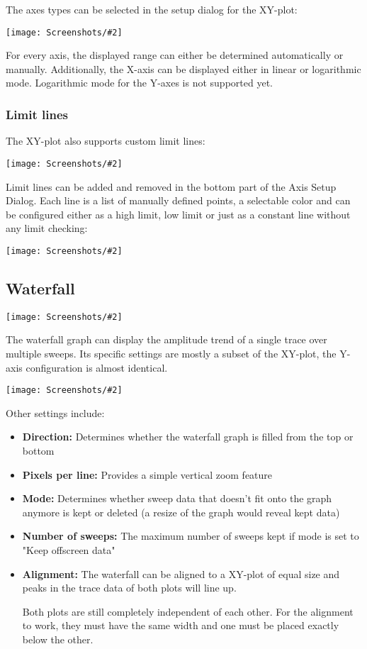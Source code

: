 \documentclass[a4paper,11pt]{article}
\newcommand\danger[1][5ex]{%
  \renewcommand\stacktype{L}%
  \scaleto{\stackon[1.3pt]{\color{red}$\triangle$}{\tiny !}}{#1}%
}
\newenvironment{important}[1][]{%
   \begin{mdframed}[%
      backgroundcolor={red!15}, hidealllines=true,
      skipabove=0.7\baselineskip, skipbelow=0.7\baselineskip,
      splitbottomskip=2pt, splittopskip=4pt, #1]%
   \makebox[0pt]{%
      \smash{%
         \hspace*{-45pt}%
         \raisebox{-5pt}{%
            {\danger}%
         }%
      }%
   }%
}{\end{mdframed}}
\newcommand{\screenshot}[2]{\begin{center}
\texttt{[image: Screenshots/\#2]}
\end{center}}
\begin{document}
The axes types can be selected in the setup dialog for the XY-plot:
\screenshot{1.0}{GraphXYplotSetup.png}
For every axis, the displayed range can either be determined automatically or manually. Additionally, the X-axis can be displayed either in linear or logarithmic mode. Logarithmic mode for the Y-axes is not supported yet.

\subsubsection{Limit lines}
The XY-plot also supports custom limit lines:
\screenshot{1.0}{GraphXYplotLimit.png}
Limit lines can be added and removed in the bottom part of the Axis Setup Dialog. Each line is a list of manually defined points, a selectable color and can be configured either as a high limit, low limit or just as a constant line without any limit checking:
\screenshot{1.0}{GraphXYplotLine.png}

\subsection{Waterfall}
\screenshot{1.0}{GraphWaterfall.png}
The waterfall graph can display the amplitude trend of a single trace over multiple sweeps. Its specific settings are mostly a subset of the XY-plot, the Y-axis configuration is almost identical.
\screenshot{0.8}{GraphWaterfallSetup.png}
Other settings include:
\begin{itemize}
\item \textbf{Direction:} Determines whether the waterfall graph is filled from the top or bottom
\item \textbf{Pixels per line:} Provides a simple vertical zoom feature
\item \textbf{Mode:} Determines whether sweep data that doesn't fit onto the graph anymore is kept or deleted (a resize of the graph would reveal kept data)
\item \textbf{Number of sweeps:} The maximum number of sweeps kept if mode is set to "Keep offscreen data"
\item \textbf{Alignment:} The waterfall can be aligned to a XY-plot of equal size and peaks in the trace data of both plots will line up.
\begin{important}
Both plots are still completely independent of each other. For the alignment to work, they must have the same width and one must be placed exactly below the other.
\end{important}
\end{itemize}
\end{document}
